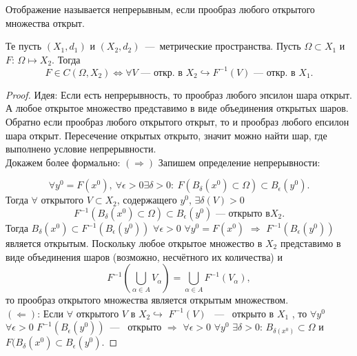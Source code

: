 \begin{lemma}

Отображение называется непрерывным, если прообраз любого открытого множества открыт.

Те пусть $(X_1, d_1)$ и $(X_2, d_2)$~---~метрические пространства. Пусть $\Omega \subset X_1$ и $F$: $\Omega \mapsto X_2$. Тогда $$ F \in C(\Omega, X_2) \Leftrightarrow \forall V\text{~---~откр. в } X_2 \hookrightarrow F^{-1}(V) \text{~---~откр. в } X_1. $$
\end{lemma}
\begin{proof}
Идея: Если есть непрерывность, то прообраз любого эпсилон шара открыт. А любое открытое множество представимо в виде объединения открытых шаров. Обратно если прообраз любого открытого открыт, то и прообраз любого епсилон шара открыт. Пересечение открытых открыто, значит можно найти шар, где выполнено условие непрерывности.\\ 

Докажем более формально: $(\Longrightarrow)$ Запишем определение непрерывности:

$$\forall y^0 = F(x^0), \  \forall \epsilon > 0 \exists \delta > 0:\ F(B_{\delta}(x^0) \subset \Omega) \subset B_{\epsilon}(y^0).$$
Тогда $\forall$ открытого $V \subset X_2$, содержащего $y^0$, $\exists \delta(V) > 0$ $$F^{-1}(B_{\delta}(x^0) \subset \Omega) \subset B_{\epsilon}(y^0) \text{~---~открыто в} X_2.$$
Тогда $B_{\delta}(x^0) \subset F^{-1}(B_{\epsilon}(y^0))$ $\forall \epsilon > 0$ $\forall y^0 = F(x^0)$ $\Rightarrow$ $F^{-1}(B_{\epsilon}(y^0))$ является открытым.
Поскольку любое открытое множество в $X_2$ представимо в виде объединения шаров (возможно, несчётного их количества) и $$
F^{-1}(\bigcup_{\alpha \in A} V_{\alpha}) = \bigcup_{\alpha \in A} F^{-1}(V_{\alpha}),$$ то прообраз открытого множества является открытым множеством. \\
$(\Longleftarrow)$: Если $\forall$ открытого $V$ в $X_2 \hookrightarrow$ $F^{-1}(V)$ ~---~ открыто в $X_1$ , то $\forall y^0$ $\forall \epsilon > 0$ $F^{-1}(B_{\epsilon}(y^0))$~---~ открыто $\Rightarrow$ $\forall\epsilon > 0$ $\forall y^0$ $\exists \delta > 0$: $B_{\delta(x^0)} \subset \Omega$ и $F(B_{\delta}(x^0) \subset B_{\epsilon}(y^0)$.
\end{proof}

